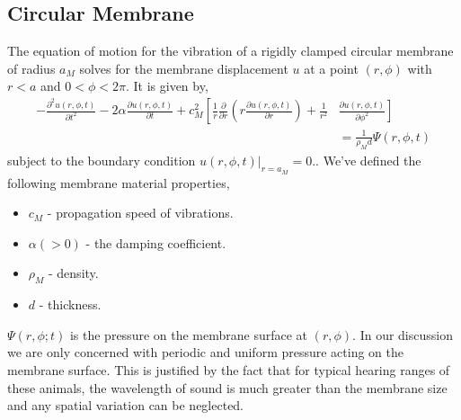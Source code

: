 \subsection{Circular Membrane}
The equation of motion for the vibration of a rigidly clamped circular membrane of radius $a_M$ solves for the membrane displacement $u$ at
a point $(r,\phi)$ with $r<a$ and $0<\phi<2\pi$. It is given by,
\begin{equation}\label{membraneequation1}
 \begin{split}
 -\frac{\partial^2 u(r,\phi,t)}{\partial t^2}-2\alpha\frac{\partial u(r,\phi,t)}{\partial t}+c^2_M \left[\frac{1}{r}\frac{\partial}{\partial r}\left(r\frac{\partial u(r,\phi,t)}{\partial r}\right)\right. +\frac{1}{r^2}&\left.\frac{\partial u(r,\phi,t)}{\partial \phi^2}\right]
 \\ &=\frac{1}{\rho_M d}\Psi(r,\phi,t)
 \end{split}
\end{equation}
subject to the boundary condition $u(r,\phi,t)|_{r=a_M}=0$.. We've defined the following membrane material properties,
\begin{itemize}
 \item $c_M$ - propagation speed of vibrations.
 \item $\alpha (>0)$ - the damping coefficient.
 \item $\rho_M$ - density.
 \item $d$ - thickness.
\end{itemize}
$\Psi(r,\phi;t)$ is the pressure on the membrane surface at $(r,\phi)$. In our discussion we are only concerned with periodic and uniform 
pressure acting on the membrane surface. This is justified by the fact that for typical hearing ranges of these animals, the wavelength
of sound is much greater than the membrane size and any spatial variation can be neglected.

